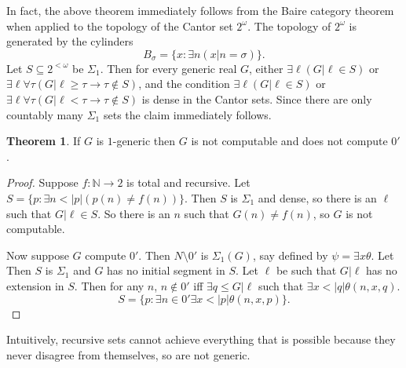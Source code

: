 \documentclass[12pt]{report}
\newcommand{\NN}{\mathbb{N}}
\theoremstyle{definition}
\newtheorem{theorem}{Theorem}[chapter]
\begin{document}
In fact, the above theorem immediately follows from the Baire category theorem when applied to the topology of the Cantor set $2^\omega$.
The topology of $2^\omega$ is generated by the cylinders
$$B_\sigma = \{x: \exists n(x|n = \sigma)\}.$$
Let $S \subseteq 2^{<\omega}$ be $\Sigma_1$. Then for every generic real $G$, either $\exists \ell(G|\ell \in S)$ or $\exists \ell\forall \tau(G|\ell \geq \tau \to \tau \notin S)$,
and the condition $\exists \ell(G|\ell \in S)$ or $\exists \ell\forall \tau(G|\ell < \tau \to \tau \notin S)$ is dense in the Cantor sets. Since there are only countably many $\Sigma_1$ sets the claim immediately follows.

\begin{theorem}
If $G$ is $1$-generic then $G$ is not computable and does not compute $0'$.
\end{theorem}
\begin{proof}
Suppose $f: \NN \to 2$ is total and recursive. Let $S = \{p: \exists n < |p|(p(n) \neq f(n))\}$. Then $S$ is $\Sigma_1$ and dense, so there is an $\ell$ such that $G|\ell \in S$.
So there is an $n$ such that $G(n) \neq f(n)$, so $G$ is not computable.

Now suppose $G$ compute $0'$. Then $N\setminus 0'$ is $\Sigma_1(G)$, say defined by $\psi = \exists x\theta$.
Let
Then $S$ is $\Sigma_1$ and $G$ has no initial segment in $S$. Let $\ell$ be such that $G|\ell$ has no extension in $S$. Then for any $n$, $n \notin 0'$ iff $\exists q \leq G|\ell$ such that $\exists x<|q|\theta(n, x, q)$.
$$S = \{p: \exists n \in 0' \exists x<|p|\theta(n, x, p)\}.$$
\end{proof}
Intuitively, recursive sets cannot achieve everything that is possible because they never disagree from themselves, so are not generic.
\end{document}
